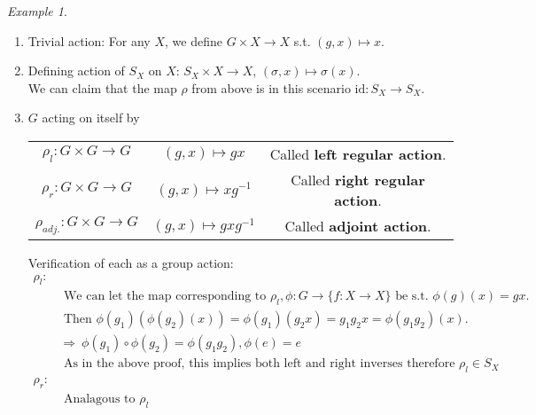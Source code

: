 \documentclass{article}
\theoremstyle{definition}
\theoremstyle{remark}
\newtheorem*{example}{Example}
\begin{document}
\begin{example}~
	\begin{enumerate}
		\item Trivial action: For any $X$, we define $G\times X\rightarrow X$ s.t. $(g,x)\mapsto x$.
		\item Defining action of $S_X$ on $X$: $S_X\times X\rightarrow X$, $(\sigma,x)\mapsto\sigma(x)$.\\ We can claim that the map $\rho$ from above is in this scenario $\mathrm{id}:S_X\rightarrow S_X$.
		\item $G$ acting on itself by \\
		      \begin{tabular}{ccc}
			      $\rho_l : G\times G\rightarrow G$    & $(g,x)\mapsto gx$       & Called \textbf{left regular action}.  \\
			      $\rho_r:G\times G\rightarrow G$      & $(g,x)\mapsto xg^{-1}$  & Called \textbf{right regular action}. \\
			      $\rho_{adj.}:G\times G\rightarrow G$ & $(g,x)\mapsto gxg^{-1}$ & Called \textbf{adjoint action}.
		      \end{tabular}
		      Verification of each as a group action:
		      \begin{align*}
			      \rho_l:      &                                                                                                                                    \\
			                   & \text{ We can let the map corresponding to }\rho_l,\phi:G\rightarrow\lbrace f:X\rightarrow X\rbrace \text{ be s.t. }\phi(g)(x)=gx. \\
			                   & \text{ Then } \phi(g_1)(\phi(g_2)(x))=\phi(g_1)(g_2x)=g_1g_2x=\phi(g_1g_2)(x).                                                     \\
			                   & \Rightarrow ~\phi(g_1)\circ\phi(g_2)=\phi(g_1g_2), \phi(e)=e                                                                       \\
			                   & \text{ As in the above proof, this implies both left and right inverses therefore }\rho_l\in S_X                                   \\
			      \rho_r:      &                                                                                                                                    \\
			                   & \text{ Analagous to }\rho_l                                                                                                        \\

\end{align*}
\end{enumerate}
\end{example}
\end{document}
